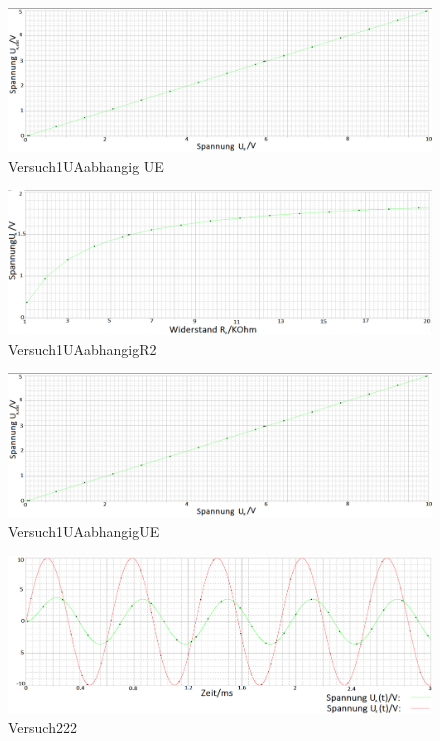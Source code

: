 \documentclass[a4paper]{article}
\begin{document}
\begin{figure}
\hspace{-4.3cm}
\includegraphics[scale=0.5]{Versuch1UAabhangigUE}
\caption{Versuch1UAabhangig UE}
\end{figure}

\begin{figure}
\hspace{-4.3cm}
\includegraphics[scale=0.5]{Versuch1UAabhangigR2}
\caption{Versuch1UAabhangigR2}
\end{figure}

\begin{figure}
\hspace{-4.3cm}
\includegraphics[scale=0.5]{Versuch1UAabhangigUE}
\caption{Versuch1UAabhangigUE}
\end{figure}

\newpage
\newpage

\begin{figure}
\hspace{-4.3cm}
\includegraphics[scale=0.5]{Versuch222}
\caption{Versuch222}
\end{figure}
\end{document}
